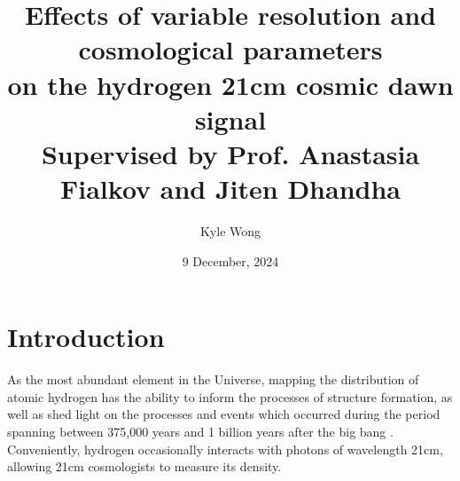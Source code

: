 \documentclass[floats,floatfix,showpacs,amssymb,prd,superscriptaddress,nofootinbib]{revtex4-2} %
\begin{document}
\title{{\titlefont Effects of variable resolution and cosmological parameters
\\on the hydrogen 21cm cosmic dawn signal}\\{\small Supervised by Prof. Anastasia Fialkov and Jiten Dhandha}}
\date{9 December, 2024}
\author{Kyle Wong}


\maketitle
\section{Introduction}



As the most abundant element in the Universe, mapping the distribution of atomic hydrogen has the ability to inform the processes of structure formation, as well as shed light on the processes and events which occurred during the period spanning between 375,000 years and 1 billion years after the big bang \cite{Pritchard_2012}. Conveniently, hydrogen occasionally interacts with photons of wavelength 21cm, allowing 21cm cosmologists to measure its density.


\end{document}
